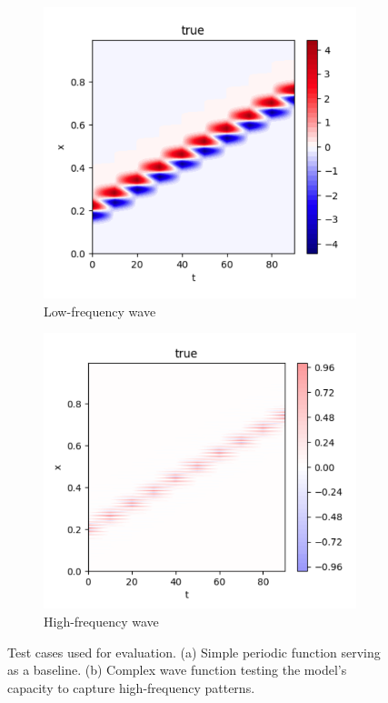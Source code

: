 \documentclass[10pt,journal,compsoc]{IEEEtran}
\begin{document}
\begin{figure}[t]
    \centering
    \begin{subfigure}[b]{0.48\linewidth}
        \includegraphics[width=\linewidth]{low_frequency}
        \caption{Low-frequency wave}
    \end{subfigure}
    \begin{subfigure}[b]{0.48\linewidth}
        \includegraphics[width=\linewidth]{high_frequency}
        \caption{High-frequency wave}
    \end{subfigure}
    \caption{Test cases used for evaluation. (a) Simple periodic function serving as a baseline. (b) Complex wave function testing the model's capacity to capture high-frequency patterns.}
    \label{fig:test_cases}
\end{figure}
\end{document}
